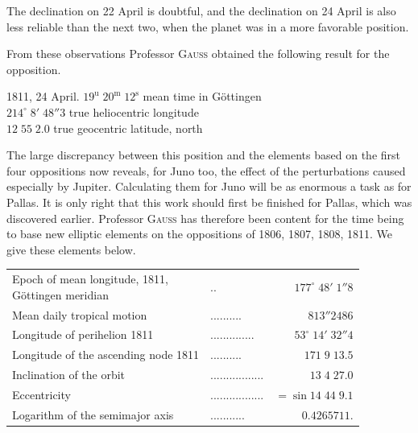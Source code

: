 \par\indent The declination on 22 April is doubtful, and the declination on 24 April is also less reliable than the next two, when the planet was in a more favorable position.

\par\indent From these observations Professor \textsc{Gauss} obtained the following result for the opposition.
\begin{center}1811, 24 April. $19^{\text{u}}\;20^{\text{m}}\;12^{\text{s}}$ mean time in Göttingen\\$214^\circ\;8'\;48''3$ true heliocentric longitude\\$12\;55\;2.0$ true geocentric latitude, north\end{center}
\par\indent The large discrepancy between this position and the elements based on the first four oppositions now reveals, for Juno too, the effect of the perturbations caused especially by Jupiter. Calculating them for Juno will be as enormous a task as for Pallas. It is only right that this work should first be finished for Pallas, which was discovered earlier. Professor \textsc{Gauss} has therefore been content for the time being to base new elliptic elements on the oppositions of 1806, 1807, 1808, 1811. We give these elements below.

\begin{center}\fontsize{10}{12}\selectfont\setlength{\tabcolsep}{4pt}\renewcommand{\arraystretch}{1.15}\begin{tabular}{llr}
\shortstack[l]{Epoch of mean longitude, 1811,\\Göttingen meridian} & .\;. & $177^\circ\;48'\;1''8$\\
Mean daily tropical motion & .\;.\;.\;.\;.\;.\;.\;.\;.\;. & $813''2486$\\
Longitude of perihelion 1811 & .\;.\;.\;.\;.\;.\;.\;.\;.\;.\;.\;.\;.\;. & $53^\circ\;14'\;32''4$\\
Longitude of the ascending node 1811 & .\;.\;.\;.\;.\;.\;.\;.\;.\;. & $171\;9\;13.5$\\
Inclination of the orbit & .\;.\;.\;.\;.\;.\;.\;.\;.\;.\;.\;.\;.\;.\;.\;.\;. & $13\;4\;27.0$\\
Eccentricity & .\;.\;.\;.\;.\;.\;.\;.\;.\;.\;.\;.\;.\;.\;.\;.\;. & $=\sin14\;44\;9.1$\\
Logarithm of the semimajor axis & .\;.\;.\;.\;.\;.\;.\;.\;.\;.\;. & $0.4265711.$\\
\end{tabular}\end{center}
